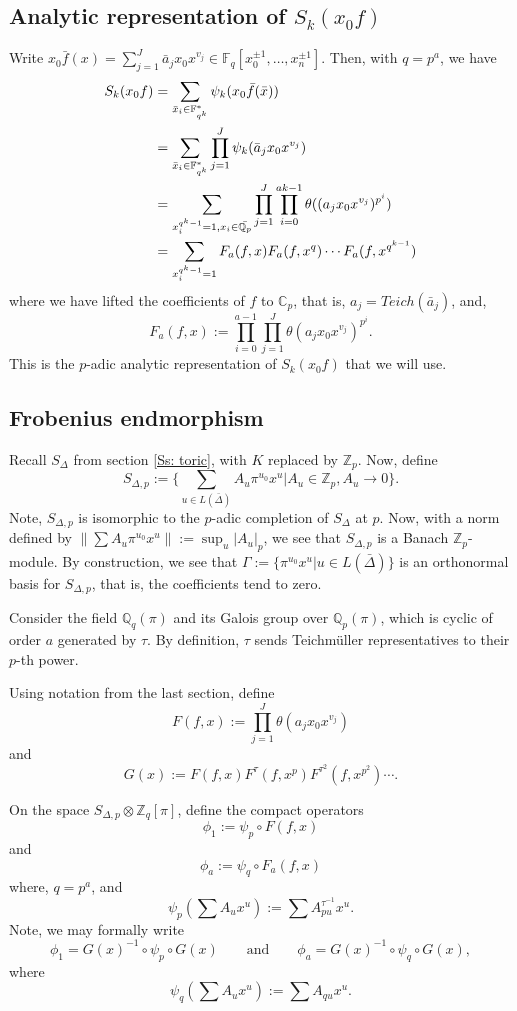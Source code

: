 \documentclass[a4paper,oneside,11pt]{article}
\theoremstyle{plain} \theoremstyle{definition}
\theoremstyle{remark}
\def\bb #1{ {\mathbb #1} }
\def\sd { S_{\Delta, p} }
\begin{document}
\subsection{Analytic representation of $S_k(x_0 f)$} 
Write $x_0 \bar f(x) = \sum_{j=1}^J \bar a_j x_0 x^{v_j} \in \bb F_q[x_0^{\pm
1}, \ldots, x_n^{\pm 1}]$. Then, with $q = p^a$, we have
\begin{align}
S_k(x_0f) &= \sum_{\bar x_i \in \bb F_{q^k}^*} \psi_k (x_0 \bar f(\bar
x)) \notag \\ &= \sum_{\bar x_i \in \bb F_{q^k}^*} \prod_{j=1}^J
\psi_k(\bar a_j x_0 x^{v_j}) \notag \\
&= \sum_{x_i^{q^k - 1} = 1, x_i \in \bar{\bb Q_p}} \prod_{j=1}^J
\prod_{i = 0}^{ak-1} \theta( (a_j x_0 x^{v_j} )^{p^i} ) \label{E:
theta} \\
&= \sum_{x_i^{q^k - 1} = 1} F_a(f, x) F_a(f, x^q) \cdots F_a(f,
x^{q^{k-1}})
\end{align}
where we have lifted the coefficients of $f$ to $\bb C_p$, that
is, $a_j = Teich(\bar a_j)$, and,
\[
F_a(f, x) := \prod_{i = 0}^{a-1} \prod_{j=1}^J \theta(a_j x_0
x^{v_j})^{p^i}.
\]
This is the $p$-adic analytic representation of $S_k(x_0 f)$
that we will use.

\subsection{Frobenius endmorphism}
Recall $S_\Delta$ from section \ref{Ss: toric}, with $K$ replaced by ${\bb Z}_p$. Now, define
\[
\sd := \{ \sum_{u \in L(\bar \Delta)} A_u \pi^{u_0} x^u | A_u \in \bb
Z_p, A_u \rightarrow 0 \}.
\]
Note, $\sd$ is isomorphic to the $p$-adic completion of $S_\Delta$
at $p$. Now, with a norm defined by $\| \sum A_u \pi^{u_0} x^u \|
:= \sup_u | A_u |_{p}$, we see that $\sd$ is a Banach $\bb
Z_p$-module. By construction, we see that $\Gamma := \{ \pi^{u_0}
x^{u} | u \in L(\bar \Delta) \}$ is an orthonormal basis for
$\sd$, that is, the coefficients tend to zero.

Consider the field $\bb Q_q(\pi)$ and its Galois group over $\bb
Q_p(\pi)$, which is cyclic of order $a$ generated by $\tau$. By
definition, $\tau$ sends Teichm\"uller representatives to their
$p$-th power.

Using notation from the last section, define
\[
F(f,x) := \prod_{j=1}^J \theta( a_j x_0 x^{v_j})
\]
and
\[
G(x) := F(f,x) F^\tau(f, x^p) F^{\tau^2}(f, x^{p^2}) \cdots.
\]

On the space $\sd \otimes \bb Z_q[\pi]$, define the compact
operators
\[
\phi_1 := \psi_p \circ F(f,x)
\]
and
\[
\phi_a := \psi_q \circ F_a(f, x)
\]
where, $q = p^a$, and
\[
\psi_p( \sum A_u x^u ) := \sum A_{pu}^{\tau^{-1}} x^u.
\]
Note, we may formally write
\[
\phi_1 = G(x)^{-1} \circ \psi_p \circ G(x) \qquad \text{and}
\qquad \phi_a = G(x)^{-1} \circ \psi_q \circ G(x),
\]
where 
\[
\psi_q( \sum A_u x^u ) := \sum A_{qu} x^u.
\]
\end{document}
